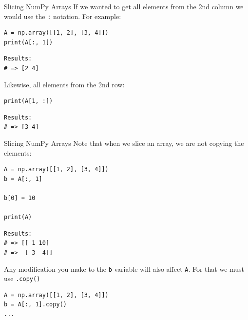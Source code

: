 \documentclass[10pt]{beamer}
\begin{document}
\begin{frame}[label={sec:org3c9f6ce},fragile]{Slicing NumPy Arrays}
 If we wanted to get all elements from the 2nd column we would use the \texttt{:} notation. For
example:

\begin{verbatim}
A = np.array([[1, 2], [3, 4]])
print(A[:, 1])
\end{verbatim}

\begin{verbatim}
Results: 
# => [2 4]
\end{verbatim}


Likewise, all elements from the 2nd row:

\begin{verbatim}
print(A[1, :])
\end{verbatim}

\begin{verbatim}
Results: 
# => [3 4]
\end{verbatim}
\end{frame}

\begin{frame}[label={sec:org6224b95},fragile]{Slicing NumPy Arrays}
 Note that when we slice an array, we are \alert{not copying} the elements:

\begin{verbatim}
A = np.array([[1, 2], [3, 4]])
b = A[:, 1]

b[0] = 10

print(A)
\end{verbatim}

\begin{verbatim}
Results: 
# => [[ 1 10]
# =>  [ 3  4]]
\end{verbatim}


Any modification you make to the \texttt{b} variable will also affect \texttt{A}. For that we must use
\texttt{.copy()}

\begin{verbatim}
A = np.array([[1, 2], [3, 4]])
b = A[:, 1].copy()
...
\end{verbatim}
\end{frame}
\end{document}
